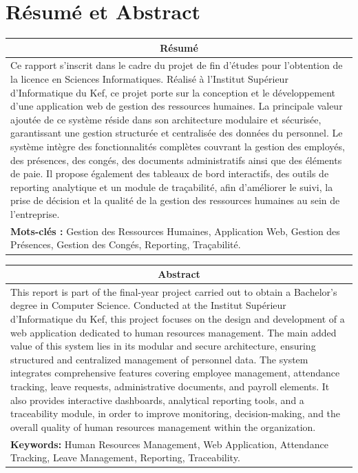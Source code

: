 


\chapter*{Résumé et Abstract}

\begin{table}[H]
\centering
\renewcommand{\arraystretch}{1.3}
\begin{tabular}{|p{15cm}|}
\hline
\multicolumn{1}{|c|}{\textbf{\large Résumé}} \\
\hline
Ce rapport s'inscrit dans le cadre du projet de fin d'études pour l'obtention de la licence en Sciences Informatiques. Réalisé à l'Institut Supérieur d'Informatique du Kef, ce projet porte sur la conception et le développement d'une application web de gestion des ressources humaines. La principale valeur ajoutée de ce système réside dans son architecture modulaire et sécurisée, garantissant une gestion structurée et centralisée des données du personnel. Le système intègre des fonctionnalités complètes couvrant la gestion des employés, des présences, des congés, des documents administratifs ainsi que des éléments de paie. Il propose également des tableaux de bord interactifs, des outils de reporting analytique et un module de traçabilité, afin d'améliorer le suivi, la prise de décision et la qualité de la gestion des ressources humaines au sein de l'entreprise. \\
\hline
\textbf{Mots-clés :} Gestion des Ressources Humaines, Application Web, Gestion des Présences, Gestion des Congés, Reporting, Traçabilité. \\
\hline
\end{tabular}
\end{table}

\vspace{0.8cm}

\begin{table}[H]
\centering
\renewcommand{\arraystretch}{1.3}
\begin{tabular}{|p{15cm}|}
\hline
\multicolumn{1}{|c|}{\textbf{\large Abstract}} \\
\hline
This report is part of the final-year project carried out to obtain a Bachelor's degree in Computer Science. Conducted at the Institut Supérieur d'Informatique du Kef, this project focuses on the design and development of a web application dedicated to human resources management. The main added value of this system lies in its modular and secure architecture, ensuring structured and centralized management of personnel data. The system integrates comprehensive features covering employee management, attendance tracking, leave requests, administrative documents, and payroll elements. It also provides interactive dashboards, analytical reporting tools, and a traceability module, in order to improve monitoring, decision-making, and the overall quality of human resources management within the organization. \\
\hline
\textbf{Keywords:} Human Resources Management, Web Application, Attendance Tracking, Leave Management, Reporting, Traceability. \\
\hline
\end{tabular}
\end{table}
